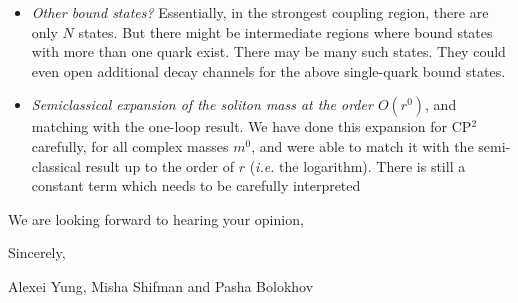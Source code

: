 \documentclass[epsfig,12pt]{article}
\begin{document}
\begin{itemize}
\item
	{\it Other bound states?}
	Essentially, in the strongest coupling region, there are only $ N $ states. 
	But there might be intermediate regions where bound states with more than one quark exist.
	There may be many such states.
	They could even open additional decay channels for the above single-quark bound states.

\item
	{\it Semiclassical expansion of the soliton mass at the order $ O(r^0) $}, and matching with 
	the one-loop result.
	We have done this expansion for CP$^2$ carefully, for all complex masses $ m^0 $, and were able
	to match it with the semi-classical result up to the order of $ r $ ({\it i.e.} the logarithm).
	There is still a constant term which needs to be carefully interpreted

\end{itemize}

\vspace{0.8cm}
	\hspace{0.5cm}We are looking forward to hearing your opinion,

\vspace{0.8cm}
	\hspace{0.3cm}Sincerely,

\vspace{0.7cm}
	\hspace{-0.7cm}
	Alexei Yung, Misha Shifman and Pasha Bolokhov
\end{document}
